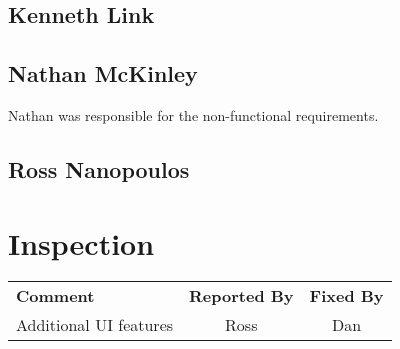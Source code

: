 \documentclass[letter]{scrartcl}
\begin{document}
\subsection{Kenneth Link}
\subsection{Nathan McKinley}
Nathan was responsible for the non-functional requirements.
\subsection{Ross Nanopoulos}

\section{Inspection}
\begin{tabularx}{\textwidth}{X c c}
\textbf{Comment} & \textbf{Reported By} & \textbf{Fixed By} \\
Additional UI features & Ross & Dan \\
\end{tabularx}
\end{document}
